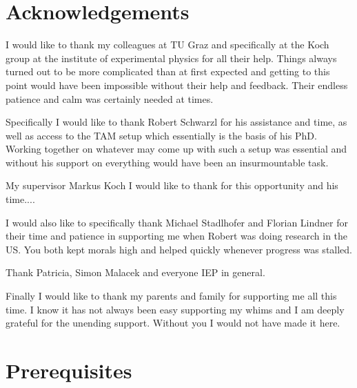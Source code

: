 \documentclass[twoside,openright,listof=numbered]{scrreprt}
\begin{document}
\chapter*{Acknowledgements}
I would like to thank my colleagues at TU Graz and specifically at the Koch group at the institute of experimental physics for all their help. Things always turned out to be more complicated than at first expected and getting to this point would have been impossible without their help and feedback. Their endless patience and calm was certainly needed at times.

Specifically I would like to thank Robert Schwarzl for his assistance and time, as well as access to the TAM setup which essentially is the basis of his PhD. Working together on whatever may come up with such a setup was essential and without his support on everything would have been an insurmountable task.

My supervisor Markus Koch I would like to thank for this opportunity and his time....

I would also like to specifically thank Michael Stadlhofer and Florian Lindner for their time and patience in supporting me when Robert was doing research in the US. You both kept morals high and helped quickly whenever progress was stalled.

Thank Patricia, Simon Malacek and everyone IEP in general.

Finally I would like to thank my parents and family for supporting me all this time. I know it has not always been easy supporting my whims and I am deeply grateful for the unending support. Without you I would not have made it here.

\tableofcontents


\chapter{Prerequisites}
\end{document}
